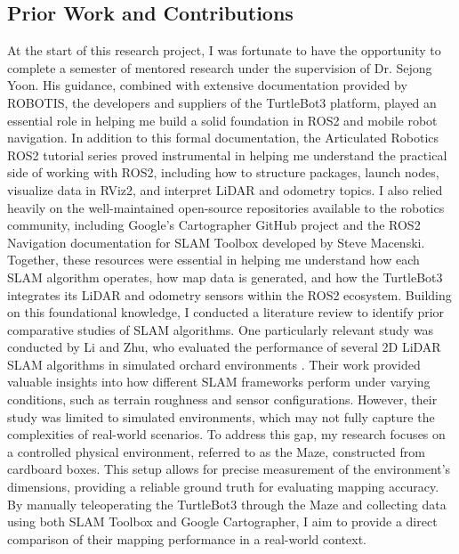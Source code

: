 \documentclass[runningheads,11pt]{llncs_bigfont_absbib}
\begin{document}
\subsection{Prior Work and Contributions}
At the start of this research project, I was fortunate to have the opportunity to complete a semester of mentored research under the supervision of Dr. Sejong Yoon. His guidance, combined with extensive documentation provided by ROBOTIS, the developers and suppliers of the TurtleBot3 platform, played an essential role in helping me build a solid foundation in ROS2 and mobile robot navigation. In addition to this formal documentation, the Articulated Robotics ROS2 tutorial series proved instrumental in helping me understand the practical side of working with ROS2, including how to structure packages, launch nodes, visualize data in RViz2, and interpret LiDAR and odometry topics. I also relied heavily on the well-maintained open-source repositories available to the robotics community, including Google’s Cartographer GitHub project and the ROS2 Navigation documentation for SLAM Toolbox developed by Steve Macenski. Together, these resources were essential in helping me understand how each SLAM algorithm operates, how map data is generated, and how the TurtleBot3 integrates its LiDAR and odometry sensors within the ROS2 ecosystem.
Building on this foundational knowledge, I conducted a literature review to identify prior comparative studies of SLAM algorithms. One particularly relevant study was conducted by Li and Zhu, who evaluated the performance of several 2D LiDAR SLAM algorithms in simulated orchard environments \cite{Li2024OrchardSLAM}. Their work provided valuable insights into how different SLAM frameworks perform under varying conditions, such as terrain roughness and sensor configurations. However, their study was limited to simulated environments, which may not fully capture the complexities of real-world scenarios.
To address this gap, my research focuses on a controlled physical environment, referred to as the Maze, constructed from cardboard boxes. This setup allows for precise measurement of the environment's dimensions, providing a reliable ground truth for evaluating mapping accuracy. By manually teleoperating the TurtleBot3 through the Maze and collecting data using both SLAM Toolbox and Google Cartographer, I aim to provide a direct comparison of their mapping performance in a real-world context.
\end{document}
